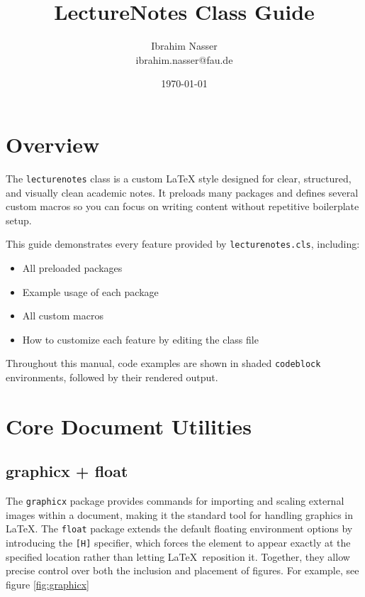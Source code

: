 \documentclass{lecturenotes}
\title{LectureNotes Class Guide}
\author{Ibrahim Nasser \\ ibrahim.nasser@fau.de}
\date{\today}
\begin{document}
\maketitle
\tableofcontents
\bigskip

\newpage
\small
\section{Overview}\label{sec:overview}
The \texttt{lecturenotes} class is a custom \LaTeX{} style designed for clear, structured, and visually clean academic notes.  
It preloads many packages and defines several custom macros so you can focus on writing content without repetitive boilerplate setup.

This guide demonstrates every feature provided by \texttt{lecturenotes.cls}, including:
\begin{itemize}
\item All preloaded packages
\item Example usage of each package
\item All custom macros
\item How to customize each feature by editing the class file
\end{itemize}

Throughout this manual, code examples are shown in shaded \texttt{codeblock} environments, followed by their rendered output.

\section{Core Document Utilities}

\subsection{graphicx + float} 
The \texttt{graphicx} \cite{ctan:graphicx} package provides commands for importing and scaling external images within a document, making it the standard tool for handling graphics in \LaTeX. The \texttt{float} \cite{ctan:float} package extends the default floating environment options by introducing the \texttt{[H]} specifier, which forces the element to appear exactly at the specified location rather than letting \LaTeX\ reposition it. Together, they allow precise control over both the inclusion and placement of figures. For example, see figure \ref{fig:graphicx}
\end{document}
